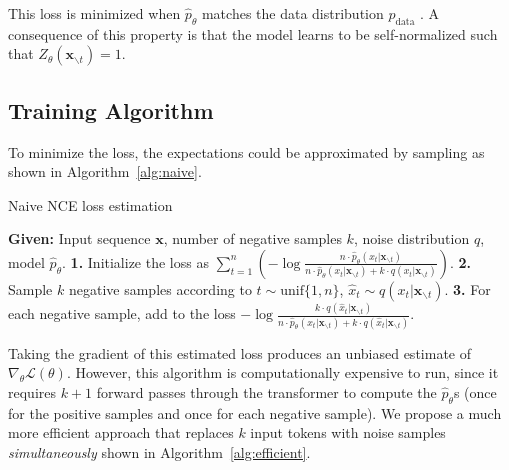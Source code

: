 \documentclass[11pt,a4paper]{article}
\newcommand{\Z}{Z_\theta(\cntxt)}
\newcommand{\bx}{\bm{x}}
\newcommand{\cntxt}{\bx_{\backslash t}}
\newcommand{\up}{\hat{p}_\theta}
\begin{document}
\noindent This loss is minimized when $\up$ matches the data distribution $p_\text{data}$ \cite{Gutmann2010NoisecontrastiveEA}.
A consequence of this property is that the model learns to be self-normalized such that $\Z = 1$. %

\subsection{Training Algorithm}
To minimize the loss, the expectations could be approximated by sampling as shown in Algorithm~\ref{alg:naive}.
\begin{algorithm}
    \caption{Naive NCE loss estimation}
    \label{alg:naive}
    \begin{algorithmic}
    \State \textbf{Given:} Input sequence $\bx$, number of negative samples $k$, noise distribution $q$, model $\up$.
    \State \textbf{1.} Initialize the loss as \phantom{aaaaaaaaaaaaaaaa} $\sum_{t=1}^n \left( -\log{\frac{n \cdot \up(x_t | \bx_{\backslash t})}{n \cdot \up(x_t | \bx_{\backslash t}) + k\cdot q(x_t | \bx_{\backslash t})}} \right)$. 
    \State \textbf{2.} Sample $k$ negative samples according to $t \sim \text{unif}\{1, n\}$, $\hat{x}_t \sim q(x_t | \bx_{\backslash t})$. 
    \State \textbf{3.} For each negative sample, add to the loss $-\log{\frac{k \cdot q(\hat{x}_t | \bx_{\backslash t})}{n \cdot \up(\hat{x}_t | \bx_{\backslash t}) + k\cdot q(\hat{x}_t | \bx_{\backslash t})}}$.
    \end{algorithmic}
    \vspace{-1mm}
\end{algorithm}
Taking the gradient of this estimated loss produces an unbiased estimate of $\nabla_\theta \mathcal{L}(\theta)$. 
However, this algorithm is computationally expensive to run, since it requires $k + 1$ forward passes through the transformer to compute the $\up$s (once for the positive samples and once for each negative sample). 
We propose a much more efficient approach that replaces $k$ input tokens with noise samples {\it simultaneously} shown in Algorithm~\ref{alg:efficient}. %
\end{document}
